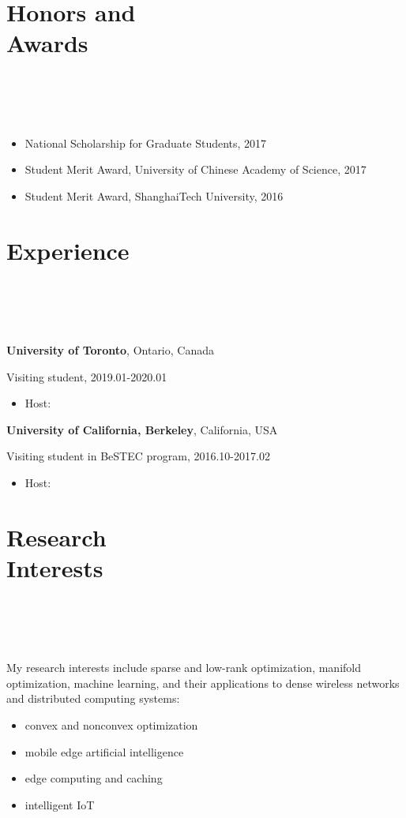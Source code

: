 \documentclass{article}
\newcommand{\homepage}[3][homepagecolor]{\href{#2}{\color{#1}{#3}}}
\begin{document}
\section*{\colorbox{mygrey}{Honors and Awards~~~~~~~~~~~~~~~~~~~~~~~~~~~~~~~~~~~~~~~~~~~~~~~~~~~~~~~~~~~~~~~~~~~~~~~~~~~~~~}}
\begin{itemize}
\item National Scholarship for Graduate Students, 2017
\item Student Merit Award, University of Chinese Academy of Science, 2017
\item Student Merit Award, ShanghaiTech University, 2016
\end{itemize}

\section*{\colorbox{mygrey}{Experience~~~~~~~~~~~~~~~~~~~~~~~~~~~~~~~~~~~~~~~~~~~~~~~~~~~~~~~~~~~~~~~~~~~~~~~~~~~~~}}
{\bf{University of Toronto}}, Ontario, Canada

Visiting student, 2019.01-2020.01
\begin{itemize}
\item Host: \homepage{https://www.comm.utoronto.ca/~weiyu/}{Prof. Wei Yu}
\end{itemize}


{\bf{University of California, Berkeley}}, California, USA

Visiting student in BeSTEC program, 2016.10-2017.02
\begin{itemize}
\item Host: \homepage{https://people.eecs.berkeley.edu/~wainwrig/}{Prof. Martin J. Wainwright}
\end{itemize}


\section*{\colorbox{mygrey}{Research Interests~~~~~~~~~~~~~~~~~~~~~~~~~~~~~~~~~~~~~~~~~~~~~~~~~~~~~~~~~~~~~~~~~~~~~~~~~~~~~~~}}
My research interests include sparse and low-rank optimization, manifold optimization, machine learning, and their applications to dense wireless networks and distributed computing systems:
\begin{itemize}
   \item convex and nonconvex optimization
   \item mobile edge artificial intelligence
   \item edge computing and caching
   \item intelligent IoT
 \end{itemize} 
\end{document}
